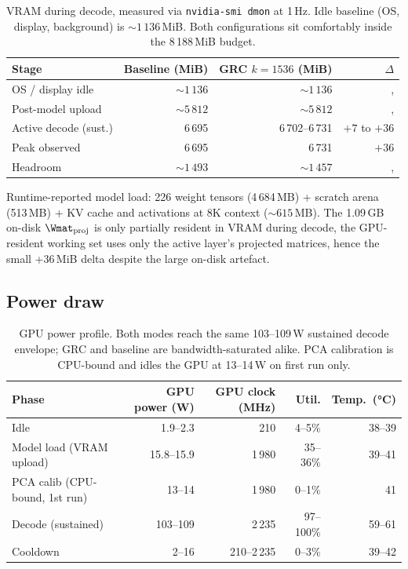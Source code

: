 \documentclass[11pt]{article}
\begin{document}
\begin{table}[h]\centering\footnotesize
\caption{VRAM during decode, measured via \texttt{nvidia-smi dmon} at 1\,Hz.
Idle baseline (OS, display, background) is ${\sim}1\,136$\,MiB. Both
configurations sit comfortably inside the 8\,188\,MiB budget.}
\begin{tabular}{@{}lrrr@{}}
\toprule
Stage & Baseline (MiB) & GRC $k{=}1536$ (MiB) & $\Delta$ \\
\midrule
OS / display idle      & ${\sim}1\,136$        & ${\sim}1\,136$        & , \\
Post-model upload      & ${\sim}5\,812$        & ${\sim}5\,812$        & , \\
Active decode (sust.)  & 6\,695                & 6\,702--6\,731        & $+7$ to $+36$\\
Peak observed          & 6\,695                & 6\,731                & $+36$\\
Headroom               & ${\sim}1\,493$        & ${\sim}1\,457$        & , \\
\bottomrule
\end{tabular}
\end{table}

Runtime-reported model load: 226 weight tensors (4\,684\,MB) +
scratch arena (513\,MB) + KV cache and activations at 8K context
(${\sim}615$\,MB). The 1.09\,GB on-disk $\Wmat_\text{proj}$ is only
partially resident in VRAM during decode, the GPU-resident working
set uses only the active layer's projected matrices, hence the small +36\,MiB
delta despite the large on-disk artefact.

\subsection{Power draw}

\begin{table}[h]\centering\footnotesize
\caption{GPU power profile. Both modes reach the same 103--109\,W sustained
decode envelope; GRC and baseline are bandwidth-saturated alike. PCA
calibration is CPU-bound and idles the GPU at 13--14\,W on first run only.}
\begin{tabular}{@{}lrrrr@{}}
\toprule
Phase & GPU power (W) & GPU clock (MHz) & Util. & Temp.\ (°C)\\
\midrule
Idle                       & 1.9--2.3   & 210         & 4--5\%     & 38--39\\
Model load (VRAM upload)   & 15.8--15.9 & 1\,980      & 35--36\%   & 39--41\\
PCA calib (CPU-bound, 1st run)
                           & 13--14     & 1\,980      & 0--1\%     & 41\\
Decode (sustained)         & 103--109   & 2\,235      & 97--100\%  & 59--61\\
Cooldown                   & 2--16      & 210--2\,235 & 0--3\%     & 39--42\\
\bottomrule
\end{tabular}
\end{table}
\end{document}

